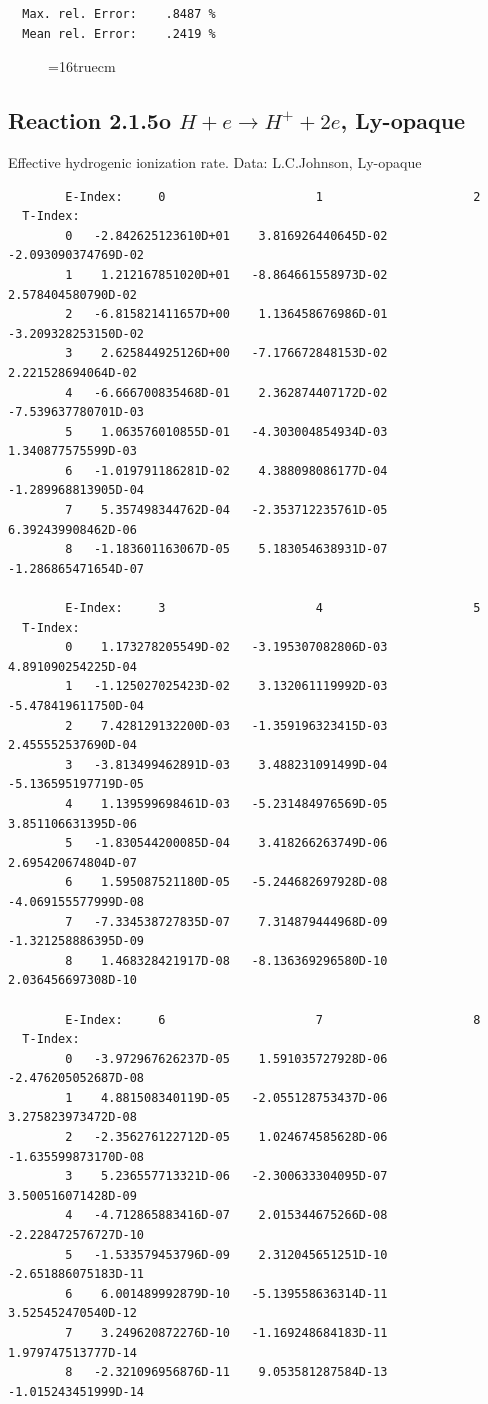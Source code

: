 \documentclass[12pt,dvips]{article}
\begin{document}
\begin{small}
\begin{verbatim}
  Max. rel. Error:    .8487 %
  Mean rel. Error:    .2419 %
\end{verbatim}\end{small}
\begin{figure} \label{2.1.5}
\epsfxsize=16truecm
\end{figure}
\newpage

\subsection{
Reaction 2.1.5o  $H + e \rightarrow H^+ + 2e $, Ly-opaque}


   Effective hydrogenic ionization rate. Data: L.C.Johnson, Ly-opaque

\begin{small}\begin{verbatim}
        E-Index:     0                     1                     2
  T-Index:
        0   -2.842625123610D+01    3.816926440645D-02   -2.093090374769D-02
        1    1.212167851020D+01   -8.864661558973D-02    2.578404580790D-02
        2   -6.815821411657D+00    1.136458676986D-01   -3.209328253150D-02
        3    2.625844925126D+00   -7.176672848153D-02    2.221528694064D-02
        4   -6.666700835468D-01    2.362874407172D-02   -7.539637780701D-03
        5    1.063576010855D-01   -4.303004854934D-03    1.340877575599D-03
        6   -1.019791186281D-02    4.388098086177D-04   -1.289968813905D-04
        7    5.357498344762D-04   -2.353712235761D-05    6.392439908462D-06
        8   -1.183601163067D-05    5.183054638931D-07   -1.286865471654D-07

        E-Index:     3                     4                     5
  T-Index:
        0    1.173278205549D-02   -3.195307082806D-03    4.891090254225D-04
        1   -1.125027025423D-02    3.132061119992D-03   -5.478419611750D-04
        2    7.428129132200D-03   -1.359196323415D-03    2.455552537690D-04
        3   -3.813499462891D-03    3.488231091499D-04   -5.136595197719D-05
        4    1.139599698461D-03   -5.231484976569D-05    3.851106631395D-06
        5   -1.830544200085D-04    3.418266263749D-06    2.695420674804D-07
        6    1.595087521180D-05   -5.244682697928D-08   -4.069155577999D-08
        7   -7.334538727835D-07    7.314879444968D-09   -1.321258886395D-09
        8    1.468328421917D-08   -8.136369296580D-10    2.036456697308D-10

        E-Index:     6                     7                     8
  T-Index:
        0   -3.972967626237D-05    1.591035727928D-06   -2.476205052687D-08
        1    4.881508340119D-05   -2.055128753437D-06    3.275823973472D-08
        2   -2.356276122712D-05    1.024674585628D-06   -1.635599873170D-08
        3    5.236557713321D-06   -2.300633304095D-07    3.500516071428D-09
        4   -4.712865883416D-07    2.015344675266D-08   -2.228472576727D-10
        5   -1.533579453796D-09    2.312045651251D-10   -2.651886075183D-11
        6    6.001489992879D-10   -5.139558636314D-11    3.525452470540D-12
        7    3.249620872276D-10   -1.169248684183D-11    1.979747513777D-14
        8   -2.321096956876D-11    9.053581287584D-13   -1.015243451999D-14


\end{verbatim}
\end{small}
\end{document}
